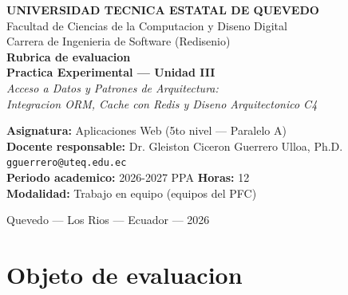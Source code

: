 \documentclass[11pt,a4paper]{article}
\begin{document}
\begin{center}
    \vspace*{0.8cm}
    {\Large\bfseries\textcolor{uteqverde}{UNIVERSIDAD TECNICA ESTATAL DE QUEVEDO}}\\[4pt]
    {\large Facultad de Ciencias de la Computacion y Diseno Digital}\\[2pt]
    {\large Carrera de Ingenieria de Software (Redisenio)}\\[16pt]

    {\LARGE\bfseries Rubrica de evaluacion}\\[4pt]
    {\LARGE\bfseries Practica Experimental --- Unidad III}\\[10pt]

    {\large\itshape Acceso a Datos y Patrones de Arquitectura:}\\
    {\large\itshape Integracion ORM, Cache con Redis y Diseno Arquitectonico C4}\\[16pt]

    \begin{tcolorbox}[colback=uteqverde!8,colframe=uteqverde,arc=3pt,
                      width=0.90\textwidth,boxrule=0.8pt]
        \centering
        \textbf{Asignatura:} Aplicaciones Web (5to nivel --- Paralelo A)\\[2pt]
        \textbf{Docente responsable:} Dr. Gleiston Ciceron Guerrero Ulloa, Ph.D.\\[2pt]
        \texttt{gguerrero@uteq.edu.ec}\\[4pt]
        \textbf{Periodo academico:} 2026-2027 PPA \quad\textbar\quad \textbf{Horas:} 12\\[2pt]
        \textbf{Modalidad:} Trabajo en equipo (equipos del PFC)
    \end{tcolorbox}

    \vspace{0.6cm}
    {\small Quevedo --- Los Rios --- Ecuador --- 2026}
\end{center}

\vspace{0.2cm}

\section{Objeto de evaluacion}
\end{document}
